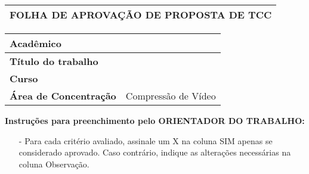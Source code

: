 
\begin{folhadeaprovacao}

    
    
    \begin{quadro}[htb]
	\centering
	\label{qua:folha_aprov_title}
	\begin{tabular}{ p{\textwidth}}
		\hline
		\cellcolor{shadecolor} \textbf{\small{FOLHA DE APROVAÇÃO DE PROPOSTA DE TCC}}\\ \hline
   
	\end{tabular}
\end{quadro}

\vspace{-22pt}

\begin{quadro}[htb]
	\centering
	\label{qua:folha_aprov}
	\begin{tabular}{|l|p{11cm}|}
		\hline
		\textbf{Acadêmico} & \imprimirautor\\ \hline
		\textbf{Título do trabalho}        & \imprimirtitulo\\ \hline
		\textbf{Curso}          & \imprimirprograma\\ \hline
		\textbf{Área de Concentração}        & Compressão de Vídeo  \\ \hline    
	\end{tabular}
\end{quadro}

\vspace{-15pt}

	\noindent \textbf{Instruções para preenchimento pelo \small{ORIENTADOR DO TRABALHO}:}
	\begin{itemize}[leftmargin=*,noitemsep,topsep=0pt]
		\item[-] \small Para cada critério avaliado, assinale um X na coluna SIM apenas se considerado aprovado. Caso contrário, indique as alterações necessárias na coluna Observação.
	\end{itemize}


\end{folhadeaprovacao}

